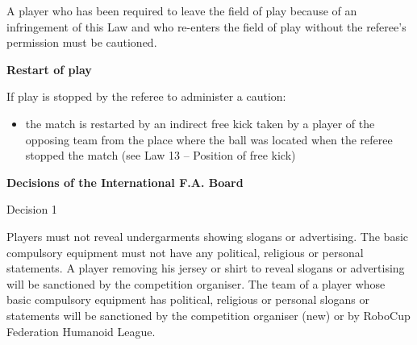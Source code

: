 \bigskip

A player who has been required to leave the field of play because of an infringement of this Law and who re-enters the field of play without the referee's permission must be cautioned.

\bigskip

\clearpage
{\bfseries Restart of play}

\headlinebox

If play is stopped by the referee to administer a caution:

\begin{itemize}
\item the match is restarted by an indirect free kick taken by a player of the opposing team from the place where the ball was located when the referee stopped the match (see Law 13 -- Position of free kick)
\end{itemize}

\bigskip


{\bfseries Decisions of the International F.A. Board }

\headlinebox

Decision 1

Players must not reveal undergarments showing slogans or advertising. The basic compulsory equipment must not have any political, religious or personal statements. A player removing his jersey or shirt to reveal slogans or advertising will be sanctioned by the competition organiser. The team of a player whose basic compulsory equipment has political, religious or personal slogans or statements will be sanctioned by the competition organiser (new) or by RoboCup Federation Humanoid League.
